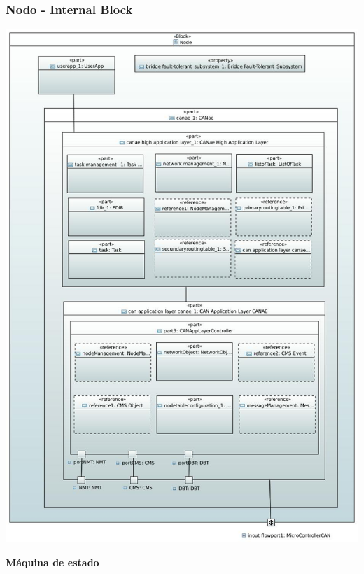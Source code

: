 \begin{frame}[c]
	\frametitle{Nodo - Internal Block}
	\centering
	\includegraphics[scale=0.15]{images/NodeInternalDiagram.JPG}
\end{frame}

\begin{frame}[c]
	\centering
	\LARGE \textbf{Máquina de estado}
\end{frame}

